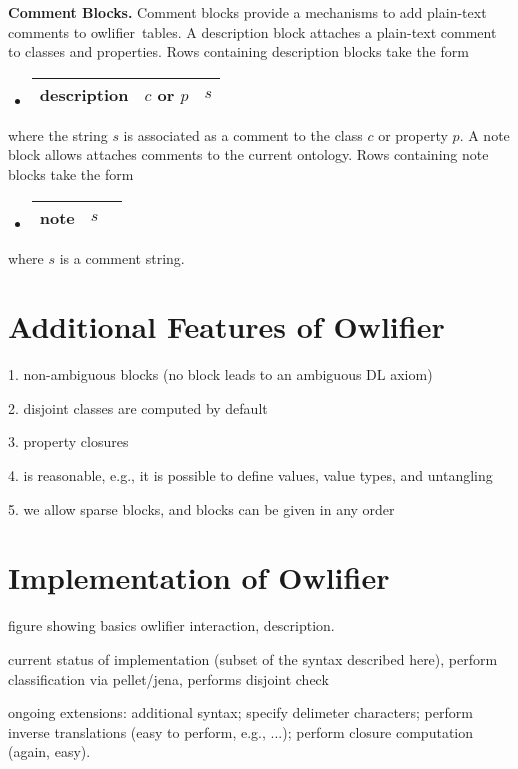 \documentclass[preprint,number]{elsarticle}
\newcommand{\Owlifier}{\textsf{Owlifier}}
\newcommand{\owlifier}{\textsf{owlifier}}
\newcommand{\myblock}[1]{\vspace{12pt}\noindent\textbf{#1}}
\begin{document}
\myblock{Comment Blocks.} Comment blocks provide a mechanisms to add
plain-text comments to \owlifier\ tables. A description block attaches
a plain-text comment to classes and properties. Rows containing
description blocks take the form
\begin{itemize}
\item[]
  \begin{tabular}{|l|l|l|}\hline \textsf{description} & $c$ or $p$ & $s$
    \\ \hline
  \end{tabular}
\end{itemize}
where the string $s$ is associated as a comment to the class $c$ or
property $p$. A note block allows attaches comments to the current
ontology. Rows containing note blocks take the form
\begin{itemize}
\item[]
  \begin{tabular}{|l|l|l|}\hline \textsf{note} & $s$
\\ \hline
  \end{tabular}
\end{itemize}
where $s$ is a comment string.


\section{Additional Features of \Owlifier}
\label{sec:characteristics}

1. non-ambiguous blocks (no block leads to an ambiguous DL axiom)

2. disjoint classes are computed by default

3. property closures

4. is reasonable, e.g., it is possible to define values, value types,
and untangling

5. we allow sparse blocks, and blocks can be given in any order


\section{Implementation of \Owlifier}
\label{sec:implementation}

figure showing basics owlifier interaction, description.

current status of implementation (subset of the syntax described here), perform classification via pellet/jena, performs disjoint check
 
ongoing extensions: additional syntax; specify delimeter characters;
perform inverse translations (easy to perform, e.g., ...); perform
closure computation (again, easy).
\end{document}
